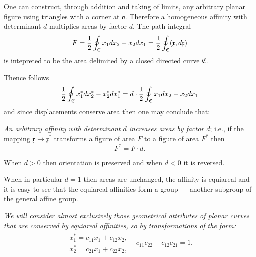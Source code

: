 \documentclass[11pt]{book} \usepackage{amssymb}
\newcommand{\myvec}[1]{\mathfrak{#1}}
\newcommand{\vecx}{\myvec{x}}
\begin{document}
One can construct, through addition and taking of limits, any arbitrary 
planar figure using triangles with a corner at $\myvec{o}$. Therefore a 
homogeneous affinity with determinant $d$ multiplies areas by factor $d$.
The path integral
\begin{equation}
  \label{eq:curve_area}
  F={1\over 2}\oint_\mathfrak{C}x_1dx_2-x_2dx_1
  ={1\over 2}\oint_\mathfrak{C}(\vecx,d\vecx)
\end{equation}
is intepreted to be the area delimited by a closed directed curve 
$\mathfrak{C}$.
\begin{figure}[htp]
  \begin{center}
  \end{center}
  \caption{}
\end{figure}
Thence follows
\begin{equation}
  \label{eq:area_transformation}
  {1\over 2}\oint_\mathfrak{C}x^*_1dx^*_2-x^*_2dx^*_1
  =d\cdot{1\over 2}\oint_\mathfrak{C}x_1dx_2-x_2dx_1
\end{equation}
and since displacements conserve area then one may conclude that:

{\em An arbitrary affinity with determinant $d$ increases areas by factor $d$};
i.e., if the mapping $\vecx\to\vecx^*$ transforms a figure of area $F$
to a figure of area $F^*$ then
\begin{equation}
  \label{eq:area_transform2}
  F^*=F\cdot d.
\end{equation}

When $d>0$ then orientation is preserved and when $d<0$ it is reversed.

When in particular $d=1$ then areas are unchanged, the affinity is equiareal
and it is easy to see that the equiareal affinities form a group --- another
subgroup of the general affine group.

{\em We will consider almost exclusively those geometrical attributes of
planar curves that are conserved by equiareal affinities, so by transformations
of the form:}
\begin{equation}
  \label{eq:equiareal_affinities}
  \begin{array}{ll}
    \begin{array}{l}
      x_1^*=c_{11}x_1+c_{12}x_2,\\
      x_2^*=c_{21}x_1+c_{22}x_2,
    \end{array}
    & c_{11}c_{22}-c_{12}c_{21}=1.
  \end{array}
\end{equation}
\end{document}
